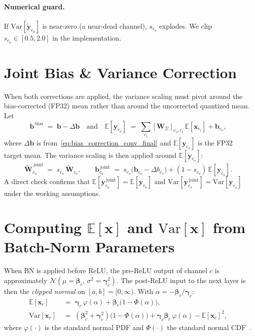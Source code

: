 \documentclass[11pt,a4paper]{article}
\newcommand{\W}{\mathbf{W}}
\newcommand{\Wt}{\widetilde{\mathbf{W}}}
\newcommand{\xx}{\mathbf{x}}
\newcommand{\y}{\mathbf{y}}
\newcommand{\yt}{\widetilde{\mathbf{y}}}
\newcommand{\bgam}{\boldsymbol{\gamma}}
\newcommand{\bbet}{\boldsymbol{\beta}}
\newcommand{\E}{\mathbb{E}}
\newcommand{\Var}{\mathrm{Var}}
\newcommand{\norm}[1]{\mathcal{N}\!\left(#1\right)}
\begin{document}
\paragraph{Numerical guard.} If $\Var[\yt_{c_o}]$ is near-zero (a near-dead channel), $s_{c_o}$ explodes. We clip $s_{c_o}\in[0.5,2.0]$ in the implementation.

\section{Joint Bias \& Variance Correction}
\label{sec:joint}

When both corrections are applied, the variance scaling must pivot around the bias-corrected (FP32) mean rather than around the uncorrected quantized mean. Let
\begin{equation}
\mathbf{b}^{\,\mathrm{bias}} \;=\; \mathbf{b} - \Delta\mathbf{b}
\quad\text{and}\quad
\E[\y_{c_o}] \;=\; \sum_{c_i}[\W_\Sigma]_{c_o,c_i}\,\E[\xx_{c_i}] + \mathbf{b}_{c_o},
\end{equation}
where $\Delta\mathbf{b}$ is from~\eqref{eq:bias_correction_conv_final} and $\E[\y_{c_o}]$ is the FP32 target mean. The variance scaling is then applied around $\E[\y_{c_o}]$:
\begin{equation}
\boxed{\;\Wt^{\,\mathrm{joint}}_{c_o} \;=\; s_{c_o}\,\Wt_{c_o}, \qquad
\mathbf{b}^{\,\mathrm{joint}}_{c_o} \;=\; s_{c_o}\bigl(\mathbf{b}_{c_o} - \Delta b_{c_o}\bigr) + (1-s_{c_o})\,\E[\y_{c_o}].\;}
\label{eq:joint_correction}
\end{equation}
A direct check confirms that $\E[\y^{\,\mathrm{joint}}_{c_o}] = \E[\y_{c_o}]$ and $\Var[\y^{\,\mathrm{joint}}_{c_o}] = \Var[\y_{c_o}]$ under the working assumptions.

\section{Computing $\E[\xx]$ and $\Var[\xx]$ from Batch-Norm Parameters}
\label{sec:clipped_normal}

When BN is applied before ReLU, the pre-ReLU output of channel $c$ is approximately $\norm{\mu=\bbet_c,\,\sigma^2=\bgam_c^2}$. The post-ReLU input to the next layer is then the \emph{clipped normal} on $[a,b]=[0,\infty)$. With $\alpha = -\bbet_c/\bgam_c$:
\begin{align}
\E[\xx_c] \;&=\; \bgam_c\,\varphi(\alpha) + \bbet_c\bigl(1 - \Phi(\alpha)\bigr), \label{eq:Ex_relu}\\
\Var[\xx_c] \;&=\; (\bbet_c^2 + \bgam_c^2)\bigl(1-\Phi(\alpha)\bigr) + \bgam_c\bbet_c\,\varphi(\alpha) - \E[\xx_c]^2,
\label{eq:Varx_relu}
\end{align}
where $\varphi(\cdot)$ is the standard normal PDF and $\Phi(\cdot)$ the standard normal CDF~\cite[App.~C]{nagel2019}.
\end{document}
